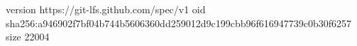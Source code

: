 version https://git-lfs.github.com/spec/v1
oid sha256:a946902f7bf04b744b5606360dd259012d9c199cbb96f616947739c0b30f6257
size 22004
